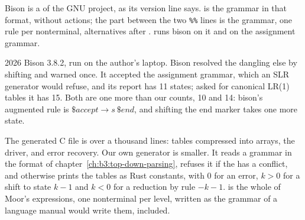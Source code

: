 Bison is a  of the GNU project, as its version line says.  is the  grammar in that format, without actions; the part between the two \texttt{\%\%} lines is the grammar, one rule per nonterminal, alternatives after \code{|}.  runs bison on it and on the assignment grammar.

\label{lst:b3:bottom-up-parsing:bison}

\label{out:b3:bottom-up-parsing:bison}

\begin{dated}{2026}
Bison 3.8.2, run on the author's laptop. Bison resolved the dangling else by shifting and warned once. It accepted the assignment grammar, which an SLR generator would refuse, and its report has 11 states; asked for canonical LR(1) tables it has 15. Both are one more than our counts, 10 and 14: bison's augmented rule is $\mathit{\$accept} \to s\ \mathit{\$end}$, and shifting the end marker takes one more state.
\end{dated}

The generated C file is over a thousand lines: tables compressed into arrays, the driver, and error recovery. Our own generator is smaller. It reads a grammar in the format of chapter~\ref{ch:b3:top-down-parsing}, refuses it if the  has a conflict, and otherwise prints the tables as Rust constants, with 0 for an error, $k > 0$ for a shift to state $k - 1$ and $k < 0$ for a reduction by rule $-k - 1$.  is the whole of Moor's expressions, one nonterminal per level, written as the grammar of a language manual would write them,  included.

\label{lst:b3:bottom-up-parsing:moorgram}

